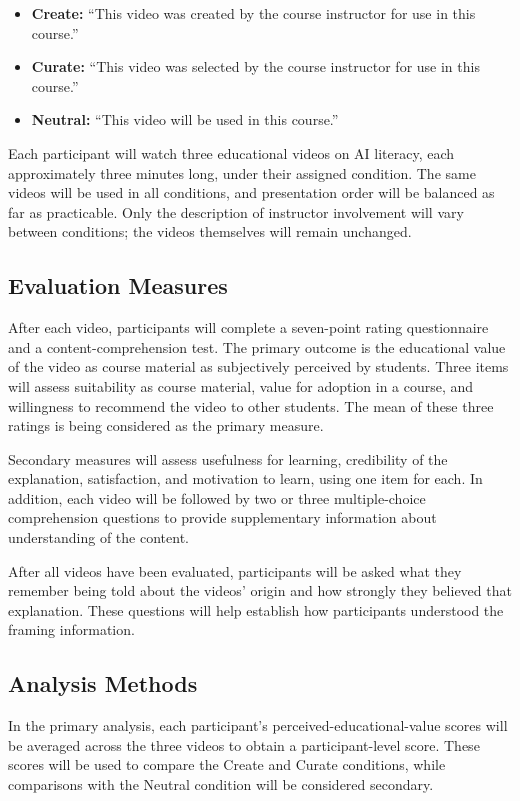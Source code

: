\documentclass[11pt]{ltjarticle}
\begin{document}
\begin{itemize}
\item \textbf{Create:} ``This video was created by the course instructor for use in this course.''
\item \textbf{Curate:} ``This video was selected by the course instructor for use in this course.''
\item \textbf{Neutral:} ``This video will be used in this course.''
\end{itemize}

Each participant will watch three educational videos on AI literacy, each approximately three minutes long, under their assigned condition. The same videos will be used in all conditions, and presentation order will be balanced as far as practicable. Only the description of instructor involvement will vary between conditions; the videos themselves will remain unchanged.

\subsection{Evaluation Measures}

After each video, participants will complete a seven-point rating questionnaire and a content-comprehension test. The primary outcome is the educational value of the video as course material as subjectively perceived by students. Three items will assess suitability as course material, value for adoption in a course, and willingness to recommend the video to other students. The mean of these three ratings is being considered as the primary measure.

Secondary measures will assess usefulness for learning, credibility of the explanation, satisfaction, and motivation to learn, using one item for each. In addition, each video will be followed by two or three multiple-choice comprehension questions to provide supplementary information about understanding of the content.

After all videos have been evaluated, participants will be asked what they remember being told about the videos' origin and how strongly they believed that explanation. These questions will help establish how participants understood the framing information.

\subsection{Analysis Methods}

In the primary analysis, each participant's perceived-educational-value scores will be averaged across the three videos to obtain a participant-level score. These scores will be used to compare the Create and Curate conditions, while comparisons with the Neutral condition will be considered secondary.
\end{document}
